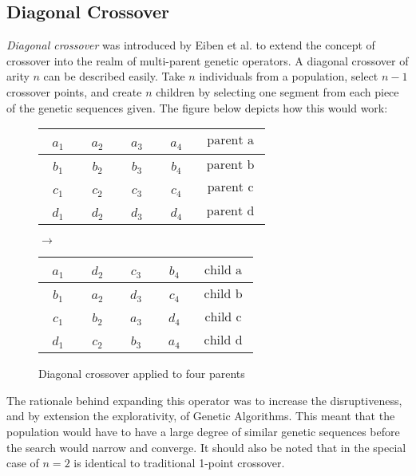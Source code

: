 \subsection*{Diagonal Crossover}
\emph{Diagonal crossover} was introduced by Eiben et al. to extend the concept of crossover into the realm of multi-parent genetic operators\cite{Eiben03}. A diagonal crossover of arity $n$ can be described easily. Take $n$ individuals from a population, select $n-1$ crossover points, and create $n$ children by selecting one segment from each piece of the genetic sequences given\cite{Eiben95}. The figure below depicts how this would work\cite{Eiben95}:
\begin{figure}[h!]
\centering
\begin{tabular}{ | c | c | c | c | c | }
\hline
~$a_1$~ & ~$a_2$~ & ~$a_3$~ & ~$a_4$~ & $\text{ parent a }$ 	\\ \hline
~$b_1$~ & ~$b_2$~ & ~$b_3$~ & ~$b_4$~ & $\text{ parent b }$ 	\\ \hline
~$c_1$~ & ~$c_2$~ & ~$c_3$~ & ~$c_4$~ & $\text{ parent c }$ 	\\ \hline
~$d_1$~ & ~$d_2$~ & ~$d_3$~ & ~$d_4$~ & $\text{ parent d }$ 	\\ \hline
\end{tabular}
$\rightarrow$
\begin{tabular}{ | c | c | c | c | c | }
\hline
~$a_1$~ & ~$d_2$~ & ~$c_3$~ & ~$b_4$~ & $\text{ child a }$ 	\\ \hline
~$b_1$~ & ~$a_2$~ & ~$d_3$~ & ~$c_4$~ & $\text{ child b }$ 	\\ \hline
~$c_1$~ & ~$b_2$~ & ~$a_3$~ & ~$d_4$~ & $\text{ child c }$ 	\\ \hline
~$d_1$~ & ~$c_2$~ & ~$b_3$~ & ~$a_4$~ & $\text{ child d }$ 	\\ \hline
\end{tabular}
\caption{Diagonal crossover applied to four parents}
\end{figure} 

The rationale behind expanding this operator was to increase the disruptiveness, and by extension the explorativity, of Genetic Algorithms\cite{Eiben97}. This meant that the population would have to have a large degree of similar genetic sequences before the search would narrow and converge\cite{Eiben95}. It should also be noted that in the special case of $n = 2$ is identical to traditional 1-point crossover\cite{Eiben95}.

